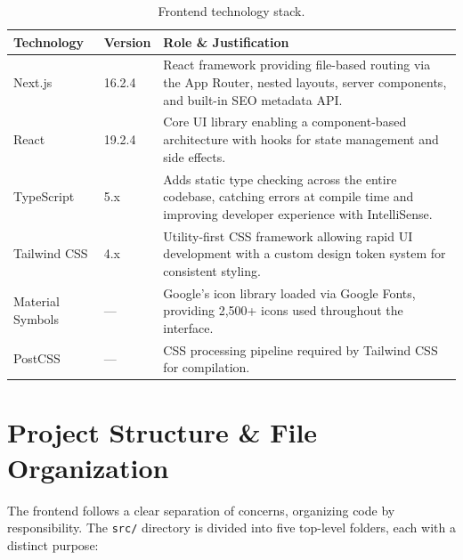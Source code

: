\documentclass[12pt,a4paper]{article}
\begin{document}
\begin{table}[H]
\centering
\begin{tabular}{@{}llp{7cm}@{}}
\toprule
\textbf{Technology} & \textbf{Version} & \textbf{Role \& Justification} \\
\midrule
Next.js & 16.2.4 & React framework providing file-based routing via the App Router, nested layouts, server components, and built-in SEO metadata API. \\
React & 19.2.4 & Core UI library enabling a component-based architecture with hooks for state management and side effects. \\
TypeScript & 5.x & Adds static type checking across the entire codebase, catching errors at compile time and improving developer experience with IntelliSense. \\
Tailwind CSS & 4.x & Utility-first CSS framework allowing rapid UI development with a custom design token system for consistent styling. \\
Material Symbols & — & Google's icon library loaded via Google Fonts, providing 2,500+ icons used throughout the interface. \\
PostCSS & — & CSS processing pipeline required by Tailwind CSS for compilation. \\
\bottomrule
\end{tabular}
\caption{Frontend technology stack.}
\end{table}

\section{Project Structure \& File Organization}

The frontend follows a clear separation of concerns, organizing code by responsibility. The \texttt{src/} directory is divided into five top-level folders, each with a distinct purpose:
\end{document}
